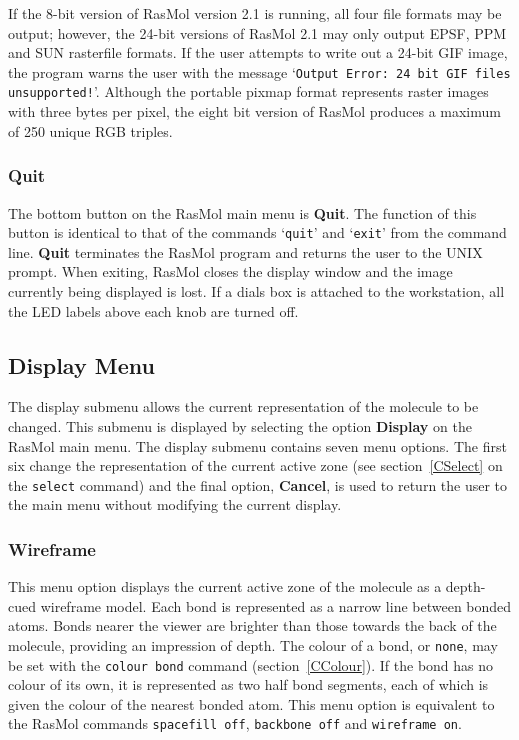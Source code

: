 If the 8-bit version of RasMol version 2.1 is running, all four file formats
may be output; however, the 24-bit versions of RasMol 2.1 may only output 
EPSF, PPM and SUN rasterfile formats. If the user attempts to write out a 
24-bit GIF image, the program warns the user with the message `{\tt Output 
Error: 24 bit GIF files unsupported!}'. Although the portable pixmap format 
represents raster images with three bytes per pixel, the eight bit version 
of RasMol produces a maximum of 250 unique RGB triples.


\subsubsection{Quit}
\label{MQuit}
The bottom button on the RasMol main menu is {\bf Quit}. The function of
this button is identical to that of the commands `{\tt quit}' and `{\tt exit}'
from the command line. {\bf Quit} terminates the RasMol program and 
returns the user to the UNIX prompt. When exiting, RasMol closes the 
display window and the image currently being displayed is lost. If a dials
box is attached to the workstation, all the LED labels above each knob
are turned off.



\subsection{Display Menu}
\label{ODisplay}
The display submenu allows the current representation of the molecule to 
be changed. This submenu is displayed by selecting the option {\bf Display}
on the RasMol main menu. The display submenu contains seven menu options.
The first six change the representation of the current active zone (see
section~\ref{CSelect} on the {\tt select} command) and the final option,
{\bf Cancel}, is used to return the user to the main menu without modifying
the current display.

\subsubsection{Wireframe}
\label{OWireframe}
This menu option displays the current active zone of the molecule as a
depth-cued wireframe model. Each bond is represented as a narrow line 
between bonded atoms. Bonds nearer the viewer are brighter than those
towards the back of the molecule, providing an impression of depth. The
colour of a bond, or {\tt none}, may be set with the {\tt colour bond}
command (section~\ref{CColour}). If the bond has no colour of its own, it 
is represented as two half bond segments, each of which is given the colour 
of the nearest bonded atom. This menu option is equivalent to the RasMol 
commands {\tt spacefill off}, {\tt backbone off} and {\tt wireframe on}.

